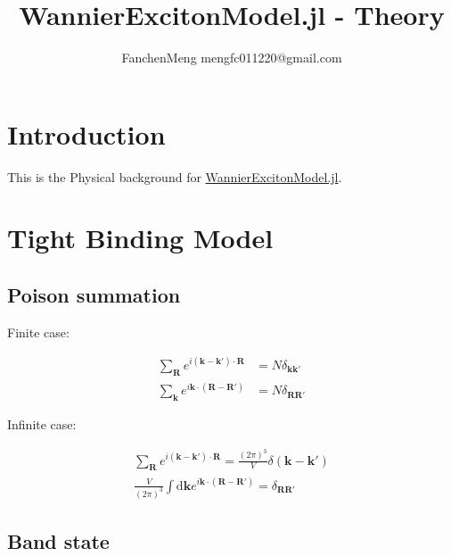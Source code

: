 \documentclass{report}
\title{WannierExcitonModel.jl - Theory}
\author{FanchenMeng mengfc011220@gmail.com}
\begin{document}
\maketitle

\tableofcontents

\newpage

\chapter{Introduction}

This is the Physical background for \href{https://github.com/MFC2001/WannierExcitonModel.jl}{WannierExcitonModel.jl}.

\chapter{Tight Binding Model}

\section{Poison summation}

\noindent
Finite case:

\begin{equation}
  \begin{aligned}
    \sum_{\boldsymbol{R}} e^{i(\boldsymbol{k}-\boldsymbol{k}') \cdot \boldsymbol{R}} &= N \delta_{\boldsymbol{k}\boldsymbol{k}'} \\
    \sum_{\boldsymbol{k}} e^{i\boldsymbol{k} \cdot (\boldsymbol{R}-\boldsymbol{R}')} &= N \delta_{\boldsymbol{R}\boldsymbol{R}'} 
  \end{aligned}
\end{equation}

\noindent
Infinite case:

\begin{equation}
  \begin{aligned}
    \sum_{\boldsymbol{R}} e^{i(\boldsymbol{k}-\boldsymbol{k}') \cdot \boldsymbol{R}} = \frac{(2\pi)^3}{V} \delta(\boldsymbol{k}-\boldsymbol{k}') \\
    \frac{V}{(2\pi)^3} \int \mathrm{d}\boldsymbol{k} e^{i\boldsymbol{k} \cdot (\boldsymbol{R}-\boldsymbol{R}')} = \delta_{\boldsymbol{R}\boldsymbol{R}'} 
  \end{aligned}
\end{equation}


\section{Band state}
\end{document}
